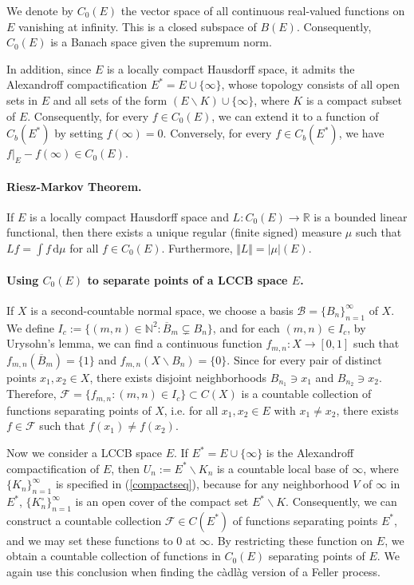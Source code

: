 \documentclass{article}
\numberwithin{equation}{section}
\renewcommand{\d}{\mathrm{d}}
\theoremstyle{plain}
\theoremstyle{definition}
\begin{document}
We denote by $C_0(E)$ the vector space of all continuous real-valued functions on $E$ vanishing at infinity. This is a closed subspace of $B(E)$. Consequently, $C_0(E)$ is a Banach space given the supremum norm.

In addition, since $E$ is a locally compact Hausdorff space, it admits the Alexandroff compactification $E^*=E\cup\{\infty\}$, whose topology consists of all open sets in $E$ and all sets of the form $(E\backslash K)\cup\{\infty\}$, where $K$ is a compact subset of $E$. Consequently, for every $f\in C_0(E)$, we can extend it to a function of $C_b(E^*)$ by setting $f(\infty)=0$. Conversely, for every $f\in C_b(E^*)$, we have $f|_E-f(\infty)\in C_0(E)$.

\paragraph{Riesz-Markov Theorem.} If $E$ is a locally compact Hausdorff space and $L:C_0(E)\to\mathbb{R}$ is a bounded linear functional, then there exists a unique regular (finite signed) measure $\mu$ such that $Lf=\int f\,\d \mu$ for all $f\in C_0(E)$. Furthermore, $\Vert L\Vert=\vert\mu\vert(E)$.

\paragraph{Using $C_0(E)$ to separate points of a LCCB space $E$.} If $X$ is a second-countable normal space, we choose a basis $\mathscr{B}=\{B_n\}_{n=1}^\infty$ of $X$. We define $I_c:=\{(m,n)\in\mathbb{N}^2:\overline{B}_m\subsetneq B_n\}$, and for each $(m,n)\in I_c$, by Urysohn's lemma, we can find a continuous function $f_{m,n}:X\to[0,1]$ such that $f_{m,n}(\overline{B}_m)=\{1\}$ and $f_{m,n}(X\backslash B_n)=\{0\}$. Since for every pair of distinct points $x_1,x_2\in X$, there exists disjoint neighborhoods $B_{n_1}\ni x_1$ and $B_{n_2}\ni x_2$. Therefore, $\mathcal{F}=\{f_{m,n}:(m,n)\in I_c\}\subset C(X)$ is a countable collection of functions separating points of $X$, i.e. for all $x_1,x_2\in E$ with $x_1\neq x_2$, there exists $f\in\mathcal{F}$ such that $f(x_1)\neq f(x_2)$.

Now we consider a LCCB space $E$. If $E^*=E\cup\{\infty\}$ is the Alexandroff compactification of $E$, then $U_n:=E^*\backslash K_n$ is a countable local base of $\infty$, where $\{K_n\}_{n=1}^\infty$ is specified in (\ref{compactseq}), because for any neighborhood $V$ of $\infty$ in $E^*$, $\{K_n^\circ\}_{n=1}^\infty$ is an open cover of the compact set $E^*\backslash K$. Consequently, we can construct a countable collection $\mathcal{F}\in C(E^*)$ of functions separating points $E^*$, and we may set these functions to $0$ at $\infty$. By restricting these function on $E$, we obtain a countable collection of functions in $C_0(E)$ separating points of $E$. We again use this conclusion when finding the càdlàg version of a Feller process.
\end{document}

